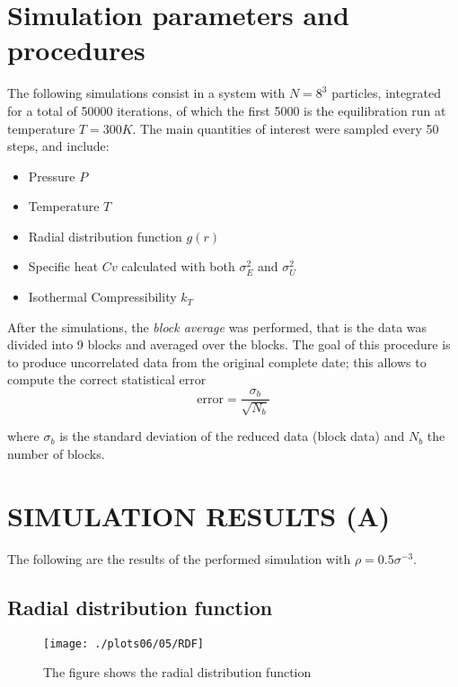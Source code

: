 \documentclass[aps,pra,reprint, onecolumn, rmp]{revtex4-2}
\begin{document}

\section{Simulation parameters and procedures}
The following simulations consist in a system with $N=8^3$ particles, integrated for a total of 50000 iterations, of which the first 5000 is the equilibration run at temperature $T=300K$. The main quantities of interest were sampled every 50 steps, and include:
\begin{itemize}
	\item Pressure $P$
	\item Temperature $T$
	\item Radial distribution function $g(r)$
	\item Specific heat $Cv$ calculated with both $\sigma_E^2$ and $\sigma_U^2$
	\item Isothermal Compressibility $k_T$
\end{itemize}
After the simulations, the \textit{block average} was performed, that is the data was divided into 9 blocks and averaged over the blocks. The goal of this procedure is to produce uncorrelated data from the original complete date; this allows to compute the correct statistical error 
\begin{equation}
	\mbox{error} = \frac{\sigma_b}{\sqrt{N_b}} 
\end{equation}

where $\sigma_b$  is the standard deviation of the reduced data (block data) and $N_b$ the number of blocks.


\section{SIMULATION RESULTS (A)}
The following are the results of the performed simulation with $\rho = 0.5\sigma^{-3}$.


\subsection{Radial distribution function}
 
\begin{figure}[h]
          \centering
          \texttt{[image: ./plots06/05/RDF]}
          \caption{The figure shows the radial distribution function}
\end{figure}
\end{document}
